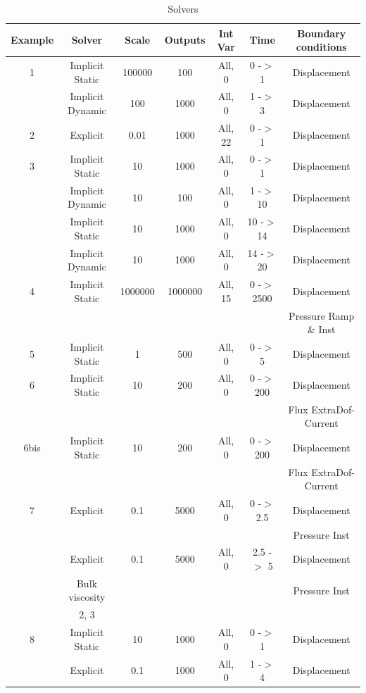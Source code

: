\documentclass[oneside,11pt,times]{book}
\begin{document}
\begin{table}[h!]
\centering
\caption{Solvers}
\label{tab solver}
\vspace{0.5cm}
    \begin{tabular}{|c|c|c|c|c|c|c|}
    \hline
    Example & Solver & Scale & Outputs & Int Var & Time & Boundary conditions\\
    \hline
    \hline
    1 & Implicit Static & 100000 & 100 & All, 0 & 0 -$>$ 1 & Displacement\\
      & Implicit Dynamic & 100 & 1000 & All, 0 & 1 -$>$ 3 & Displacement \\
    \hline
    2 & Explicit & 0.01 & 1000 & All, 22 & 0 -$>$ 1 & Displacement \\
    \hline
    3 & Implicit Static & 10 & 1000 & All, 0 & 0 -$>$ 1 & Displacement\\
      & Implicit Dynamic & 10 & 100 & All, 0 & 1 -$>$ 10 & Displacement \\
      & Implicit Static & 10 & 1000 & All, 0 & 10 -$>$ 14 & Displacement\\
      & Implicit Dynamic & 10 & 1000 & All, 0 & 14 -$>$ 20 & Displacement \\
    \hline
    4 & Implicit Static & 1000000 & 1000000 & All, 15 & 0 -$>$ 2500 & Displacement\\
      &   &   &   &   &   & Pressure Ramp \& Inst\\
    \hline
    5 & Implicit Static & 1 & 500 & All, 0 & 0 -$>$ 5 & Displacement\\
    \hline
    6 & Implicit Static & 10 & 200 & All, 0 & 0 -$>$ 200 & Displacement\\
     & & & & & & Flux ExtraDof-Current\\
    \hline
    6bis & Implicit Static & 10 & 200 & All, 0 & 0 -$>$ 200 & Displacement\\
     & & & & & & Flux ExtraDof-Current\\
    \hline
    7 & Explicit & 0.1 & 5000 & All, 0 & 0 -$>$ 2.5 & Displacement\\
     & & & & & & Pressure Inst\\
     & Explicit & 0.1 & 5000 & All, 0 & 2.5 -$>$ 5 & Displacement\\
     & Bulk viscosity & & & & & Pressure Inst\\
     & 2, 3 & & & & & \\
    \hline
    8 & Implicit Static & 10 & 1000 & All, 0 & 0 -$>$ 1 & Displacement\\
     & Explicit & 0.1 & 1000 & All, 0 & 1 -$>$ 4 & Displacement\\

\end{tabular}
\end{table}
\end{document}
